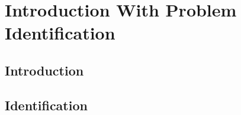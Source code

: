 \chapter{Introduction With Problem Identification}
\thispagestyle{plain}

\section{Introduction}
\newpage
\thispagestyle{fancy}
\section{Identification}